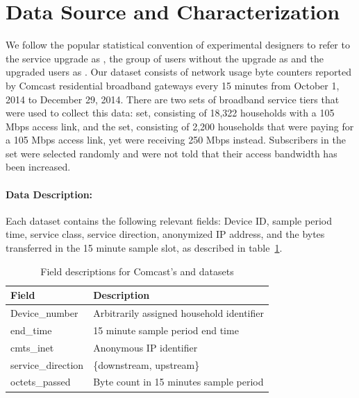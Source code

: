 \section{Data Source and Characterization}\label{sec:data}



We follow the popular statistical convention of experimental designers to 
refer to the service upgrade as \factor{}, the group of users without the 
upgrade as \control{} and the upgraded users as \treatment{} 
\cite{stats-design}. Our dataset consists of network usage byte counters 
reported by Comcast residential broadband gateways every 15 minutes from October 
1, 2014 to December 29, 2014. There are two sets of broadband service tiers that 
were used to collect this data: \control{} set, consisting of 
18,322 households with a 105 Mbps access link, and the 
\treatment{} set, consisting of 2,200 households that were 
paying for a 105 Mbps access link, yet were receiving 250 Mbps instead. 
Subscribers in the \treatment{} set were selected randomly and were not told 
that their access bandwidth has been increased.


\paragraph{Data Description: }Each dataset contains the following relevant 
fields: Device ID, sample period time, service class, service direction, 
anonymized IP address, and the bytes transferred in the 15 minute sample slot, 
as described in table~\ref{tab:field-description}.

\begin{table}[ht]
\small
\begin{tabular}{ l l }
\hline
\textbf{Field}         & \textbf{Description}				\\\hline
Device\_number         & Arbitrarily assigned household identifier	\\
end\_time              & 15 minute sample period end time		\\
cmts\_inet             & Anonymous IP identifier			\\
service\_direction     & \{downstream, upstream\}                 	\\
octets\_passed         & Byte count in 15 minutes sample period		\\\hline
\end{tabular}
\caption{Field descriptions for Comcast's \control{} and \treatment{} datasets}
\label{tab:field-description}
\end{table}


